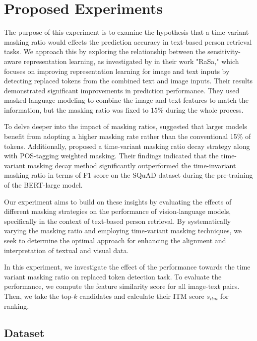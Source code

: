 \chapter{Proposed Experiments}

The purpose of this experiment is to examine the hypothesis that a time-variant masking ratio would effects the prediction accuracy in text-based person retrieval tasks. We approach this by exploring the relationship between the sensitivity-aware representation learning, as investigated by \cite{Bai2023RaSaRA} in their work "RaSa," which focuses on improving representation learning for image and text inputs by detecting replaced tokens from the combined text and image inputs. Their results demonstrated significant improvements in prediction performance. They used masked language modeling to combine the image and text features to match the information, but the masking ratio was fixed to 15\% during the whole process.

To delve deeper into the impact of masking ratios, \cite{wettig-etal-2023-mask} suggested that larger models benefit from adopting a higher masking rate rather than the  conventional 15\% of tokens. Additionally, \cite{yang2023learningbettermaskingbetter} proposed a time-variant masking ratio decay strategy along with POS-tagging weighted masking. Their findings indicated that the time-variant masking decay method significantly outperformed the time-invariant masking ratio in terms of F1 score on the SQuAD dataset during the pre-training of the BERT-large model.

Our experiment aims to build on these insights by evaluating the effects of different masking strategies on the performance of vision-language models, specifically in the context of text-based person retrieval. By systematically varying the masking ratio and employing time-variant masking techniques, we seek to determine the optimal approach for enhancing the alignment and interpretation of textual and visual data.

In this experiment, we investigate the effect of the performance towards the time variant masking ratio on replaced token detection task. To evaluate the performance, we compute the feature similarity score for all image-text pairs. Then, we take the top-$k$ candidates and calculate their ITM score $s_{itm}$ for ranking. 

\section{Dataset}

